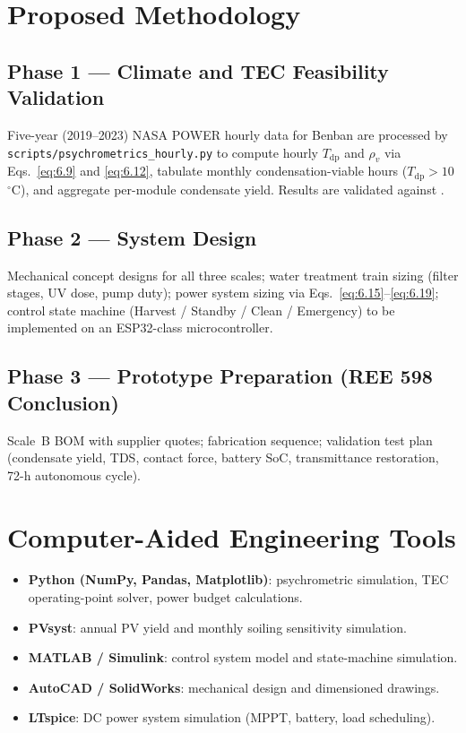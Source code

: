 \documentclass[12pt,a4paper]{report}
\numberwithin{equation}{chapter}
\numberwithin{figure}{chapter}
\numberwithin{table}{chapter}
\newcommand{\degC}{$^\circ$C}
\begin{document}
\section{Proposed Methodology}

\subsection{Phase 1 --- Climate and TEC Feasibility Validation}

Five-year (2019--2023) NASA POWER hourly data \cite{nasa_power} for Benban are processed
by \texttt{scripts/psychrometrics\_hourly.py} to compute hourly $T_\mathrm{dp}$ and
$\rho_v$ via Eqs.~\eqref{eq:6.9} and \eqref{eq:6.12}, tabulate monthly condensation-viable
hours ($T_\mathrm{dp} > 10$\,\degC), and aggregate per-module condensate yield. Results
are validated against \cite{alqaed2023awg,eslami2021tec,shourideh2021tec}.

\subsection{Phase 2 --- System Design}

Mechanical concept designs for all three scales; water treatment train sizing (filter
stages, UV dose, pump duty); power system sizing via Eqs.~\eqref{eq:6.15}--\eqref{eq:6.19};
control state machine (Harvest / Standby / Clean / Emergency) to be implemented on
an ESP32-class microcontroller.

\subsection{Phase 3 --- Prototype Preparation (REE 598 Conclusion)}

Scale~B BOM with supplier quotes; fabrication sequence; validation test plan (condensate
yield, TDS, contact force, battery SoC, transmittance restoration, 72-h autonomous cycle).

\section{Computer-Aided Engineering Tools}

\begin{itemize}[leftmargin=*]
  \item \textbf{Python (NumPy, Pandas, Matplotlib)}: psychrometric simulation, TEC
        operating-point solver, power budget calculations.
  \item \textbf{PVsyst}: annual PV yield and monthly soiling sensitivity simulation.
  \item \textbf{MATLAB / Simulink}: control system model and state-machine simulation.
  \item \textbf{AutoCAD / SolidWorks}: mechanical design and dimensioned drawings.
  \item \textbf{LTspice}: DC power system simulation (MPPT, battery, load scheduling).
\end{itemize}
\end{document}
